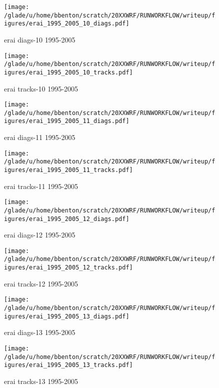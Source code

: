 \clearpage

\begin{figure}[!tbp]
\centering
\begin{minipage}[b]{0.45\textwidth}
\texttt{[image: /glade/u/home/bbenton/scratch/20XXWRF/RUNWORKFLOW/writeup/figures/erai\_1995\_2005\_10\_diags.pdf]}
\caption{erai diags-10 1995-2005}
\end{minipage}
\hfill
\begin{minipage}[b]{0.45\textwidth}
\texttt{[image: /glade/u/home/bbenton/scratch/20XXWRF/RUNWORKFLOW/writeup/figures/erai\_1995\_2005\_10\_tracks.pdf]}
\caption{erai tracks-10 1995-2005}
\end{minipage}
\end{figure}

\begin{figure}[!tbp]
\centering
\begin{minipage}[b]{0.45\textwidth}
\texttt{[image: /glade/u/home/bbenton/scratch/20XXWRF/RUNWORKFLOW/writeup/figures/erai\_1995\_2005\_11\_diags.pdf]}
\caption{erai diags-11 1995-2005}
\end{minipage}
\hfill
\begin{minipage}[b]{0.45\textwidth}
\texttt{[image: /glade/u/home/bbenton/scratch/20XXWRF/RUNWORKFLOW/writeup/figures/erai\_1995\_2005\_11\_tracks.pdf]}
\caption{erai tracks-11 1995-2005}
\end{minipage}
\end{figure}

\begin{figure}[!tbp]
\centering
\begin{minipage}[b]{0.45\textwidth}
\texttt{[image: /glade/u/home/bbenton/scratch/20XXWRF/RUNWORKFLOW/writeup/figures/erai\_1995\_2005\_12\_diags.pdf]}
\caption{erai diags-12 1995-2005}
\end{minipage}
\hfill
\begin{minipage}[b]{0.45\textwidth}
\texttt{[image: /glade/u/home/bbenton/scratch/20XXWRF/RUNWORKFLOW/writeup/figures/erai\_1995\_2005\_12\_tracks.pdf]}
\caption{erai tracks-12 1995-2005}
\end{minipage}
\end{figure}

\begin{figure}[!tbp]
\centering
\begin{minipage}[b]{0.45\textwidth}
\texttt{[image: /glade/u/home/bbenton/scratch/20XXWRF/RUNWORKFLOW/writeup/figures/erai\_1995\_2005\_13\_diags.pdf]}
\caption{erai diags-13 1995-2005}
\end{minipage}
\hfill
\begin{minipage}[b]{0.45\textwidth}
\texttt{[image: /glade/u/home/bbenton/scratch/20XXWRF/RUNWORKFLOW/writeup/figures/erai\_1995\_2005\_13\_tracks.pdf]}
\caption{erai tracks-13 1995-2005}
\end{minipage}
\end{figure}

